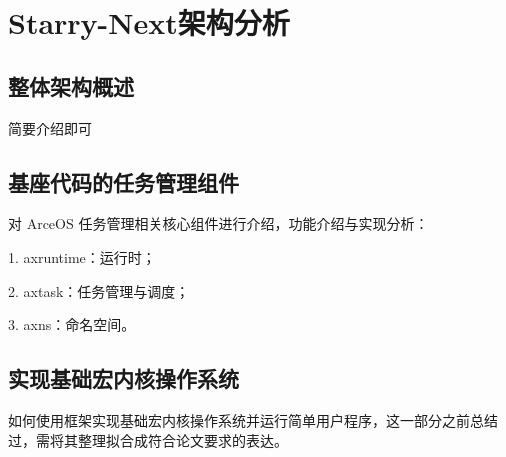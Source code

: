 
\chapter{Starry-Next架构分析}

\section{整体架构概述}

简要介绍即可



\section{基座代码的任务管理组件}

对 ArceOS 任务管理相关核心组件进行介绍，功能介绍与实现分析：

1. axruntime：运行时；

2. axtask：任务管理与调度；

3. axns：命名空间。



\section{实现基础宏内核操作系统}

如何使用框架实现基础宏内核操作系统并运行简单用户程序，这一部分之前总结过，需将其整理拟合成符合论文要求的表达。

